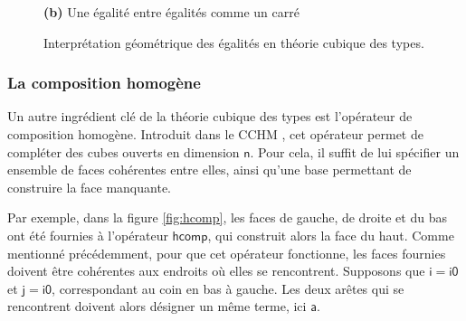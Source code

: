 \documentclass[11pt]{article}
\begin{document}
\begin{figure}[htbp]
\begin{minipage}[c]{0.47\textwidth}

    \medskip
    \textbf{(b)} Une égalité entre égalités comme un carré
\end{minipage}

\caption{Interprétation géométrique des égalités en théorie cubique des types.}
\label{fig:geometrie-cubique}
\end{figure}

\subsubsection{La composition homogène}
Un autre ingrédient clé de la théorie cubique des types est l’opérateur de composition homogène.
Introduit dans le CCHM \cite{cohen2016cubical}, cet opérateur permet de compléter des cubes ouverts en dimension $\mathsf{n}$.
Pour cela, il suffit de lui spécifier un ensemble de faces cohérentes entre elles, ainsi qu’une base permettant de construire la face manquante.

Par exemple, dans la figure \ref{fig:hcomp}, les faces de gauche, de droite et du bas ont été fournies à l’opérateur $\mathsf{hcomp}$,
qui construit alors la face du haut.
Comme mentionné précédemment, pour que cet opérateur fonctionne, les faces fournies doivent être cohérentes aux endroits où elles se rencontrent.
Supposons que $\mathsf{i = i0}$ et $\mathsf{j = i0}$, correspondant au coin en bas à gauche.
Les deux arêtes qui se rencontrent doivent alors désigner un même terme, ici $\mathsf{a}$.
\end{document}
